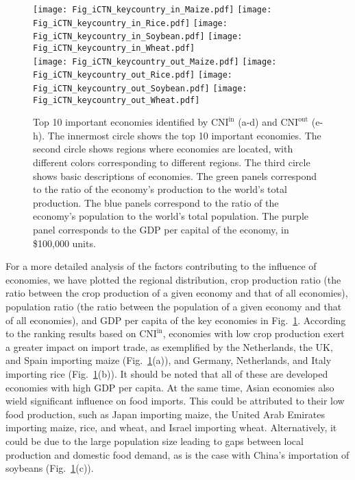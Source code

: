 \documentclass[preprint,3p,times,sort&compress]{elsarticle}
\begin{document}
 \begin{figure}[h!]
      \centering
      \texttt{[image: Fig\_iCTN\_keycountry\_in\_Maize.pdf]}
      \texttt{[image: Fig\_iCTN\_keycountry\_in\_Rice.pdf]}
      \texttt{[image: Fig\_iCTN\_keycountry\_in\_Soybean.pdf]}
      \texttt{[image: Fig\_iCTN\_keycountry\_in\_Wheat.pdf]}\\
      \texttt{[image: Fig\_iCTN\_keycountry\_out\_Maize.pdf]}
      \texttt{[image: Fig\_iCTN\_keycountry\_out\_Rice.pdf]}
      \texttt{[image: Fig\_iCTN\_keycountry\_out\_Soybean.pdf]}
      \texttt{[image: Fig\_iCTN\_keycountry\_out\_Wheat.pdf]}\\
      \caption{Top 10 important economies identified by $\mathrm{CNI^{\mathrm{in}}}$ (a-d) and $\mathrm{CNI^{\mathrm{out}}}$ (e-h). The innermost circle shows the top 10 important economies. The second circle shows regions where economies are located, with different colors corresponding to different regions. The third circle shows basic descriptions of economies. The green panels correspond to the ratio of the economy's production to the world's total production. The blue panels correspond to the ratio of the economy's population to the world's total population. The purple panel corresponds to the GDP per capital of the economy, in \$100,000 units. }
      \label{Fig:keycountry:CNI}
\end{figure}




For a more detailed analysis of the factors contributing to the influence of economies, we have plotted the regional distribution, crop production ratio (the ratio between the crop production of a given economy and that of all economies), population ratio (the ratio between the population of a given economy and that of all economies), and GDP per capita of the key economies in Fig.~\ref{Fig:keycountry:CNI}. According to the ranking results based on $\mathrm{CNI}^{\mathrm{in}}$, economies with low crop production exert a greater impact on import trade, as exemplified by the Netherlands, the UK, and Spain importing maize (Fig.~\ref{Fig:keycountry:CNI}(a)), and Germany, Netherlands, and Italy importing rice (Fig.~\ref{Fig:keycountry:CNI}(b)). It should be noted that all of these are developed economies with high GDP per capita. At the same time, Asian economies also wield significant influence on food imports. This could be attributed to their low food production, such as Japan importing maize, the United Arab Emirates importing maize, rice, and wheat, and Israel importing wheat. Alternatively, it could be due to the large population size leading to gaps between local production and domestic food demand, as is the case with China's importation of soybeans (Fig.~\ref{Fig:keycountry:CNI}(c)).
\end{document}
